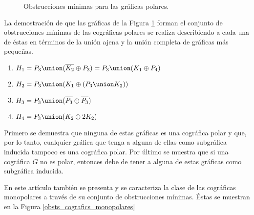 \begin{figure}[H]
\begin{center}
\end{center}
\caption{Obstrucciones mínimas para las gráficas polares.}
\label{obsts_cografics_polares}
\end{figure}

La demostración de que las gráficas de la Figura \ref{obsts_cografics_polares} forman el conjunto de obstrucciones mínimas de las cográficas polares se realiza describiendo a cada una de éstas en términos de la unión ajena y la unión completa de gráficas más pequeñas.

\begin{enumerate}[(1)]
    \item $H_1 = P_3 \union ( \overline{K_2} \oplus P_3) = P_3\union (K_1 \oplus P_4)$
    \item $H_2 = P_3 \union (K_1 \oplus (P_3 \union K_2))$
    \item $H_3 = P_3 \union ( \overline{P_3} \oplus \overline{P_3})$
    \item $H_4 = P_3 \union (K_2 \oplus 2K_2)$
\end{enumerate}

Primero se demuestra que ninguna de estas gráficas es una cográfica polar y que, por lo tanto, cualquier gráfica que tenga a alguna de ellas como subgráfica inducida tampoco es una cográfica polar. Por último se muestra que si una cográfica $G$ no es polar, entonces debe de tener a alguna de estas gráficas como subgráfica inducida. 

En este artículo también se presenta y se caracteriza la clase de las cográficas monopolares a través de su conjunto de obstrucciones mínimas. Éstas se muestran en la Figura \ref{obsts_cografics_monopolares} 



